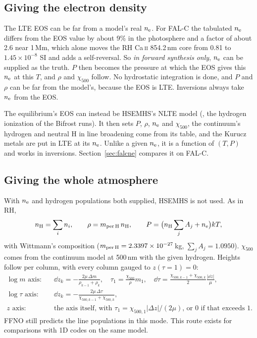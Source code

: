 \subsection{Giving the electron density}
The LTE EOS can be far from a model's real $n_{\rm e}$. For FAL-C the tabulated $n_{\rm e}$ differs from the EOS value by about 9\% in the photosphere and a factor of about 2.6 near 1\,Mm, which alone moves the RH Ca\,\textsc{ii} 854.2\,nm core from 0.81 to $1.45\times10^{-8}$ SI and adds a self-reversal. So \emph{in forward synthesis only}, $n_{\rm e}$ can be supplied as the truth. $P$ then becomes the pressure at which the EOS gives this $n_{\rm e}$ at this $T$, and $\rho$ and $\chi_{500}$ follow. No hydrostatic integration is done, and $P$ and $\rho$ can be far from the model's, because the EOS is LTE. Inversions always take $n_{\rm e}$ from the EOS.

The equilibrium's EOS can instead be HSEMHS's NLTE model (, the hydrogen ionization of the Bifrost  runs). It then sets $P$, $\rho$, $n_{\rm e}$ and $\chi_{500}$, the continuum's hydrogen and neutral H in line broadening come from its table, and the Kurucz metals are put in LTE at its $n_{\rm e}$. Unlike a given $n_{\rm e}$, it is a function of $(T,P)$ and works in inversions. Section~\ref{sec:falcne} compares it on FAL-C.

\subsection{Giving the whole atmosphere}
With $n_{\rm e}$ and hydrogen populations both supplied, HSEMHS is not used. As in RH,
\begin{gather}
n_{\rm H}=\sum_i n_i,\qquad \rho=m_{\rm per\,H}\,n_{\rm H},\qquad P=\big(n_{\rm H}\sum_j A_j+n_{\rm e}\big)kT,
\end{gather}
with Wittmann's composition ($m_{\rm per\,H}=2.3397\times10^{-27}$\,kg, $\sum_j A_j=1.0950$). $\chi_{500}$ comes from the continuum model at 500\,nm with the given hydrogen. Heights follow per column, with every column gauged to $z(\tau=1)=0$:
\begin{align}
\log m\text{ axis:}&\quad \dd z_k=-\frac{2\mu\,\Delta m}{\rho_{k-1}+\rho_k},\quad \tau_1=\frac{\chi_{500}}{\rho}m_1,\quad\dd\tau=\frac{\chi_{500,k-1}+\chi_{500,k}}{2}\frac{|\dd z|}{\mu},\\
\log\tau\text{ axis:}&\quad \dd z_k=-\frac{2\mu\,\Delta\tau}{\chi_{500,k-1}+\chi_{500,k}},\\
z\text{ axis:}&\quad\text{the axis itself, with }\tau_1=\chi_{500,1}|\Delta z|/(2\mu)\text{, or 0 if that exceeds 1.}
\end{align}
FFNO still predicts the line populations in this mode. This route exists for comparisons with 1D codes on the same model.

